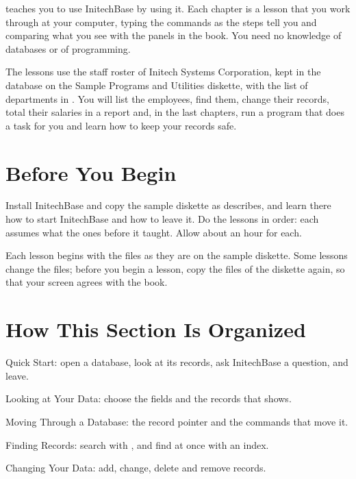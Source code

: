  teaches you to use InitechBase by using it.
Each chapter is a lesson that you work through at your computer, typing the
commands as the steps tell you and comparing what you see with the panels in
the book.  You need no knowledge of databases or of programming.

The lessons use the staff roster of Initech Systems Corporation, kept in the
database  on the Sample Programs and Utilities diskette, with
the list of departments in .  You will list the employees,
find them, change their records, total their salaries in a report and, in the
last chapters, run a program that does a task for you and learn how to
keep your records safe.

\section{Before You Begin}
Install InitechBase and copy the sample diskette as  describes, and learn there how to start InitechBase and how to leave
it.  Do the lessons in order: each assumes what the ones before it taught.
Allow about an hour for each.

Each lesson begins with the files as they are on the sample diskette.  Some
lessons change the files; before you begin a lesson, copy the files of the
diskette again, so that your screen agrees with the book.

\section{How This Section Is Organized}
Quick Start: open a database, look at its records, ask
InitechBase a question, and leave.

Looking at Your Data: choose the fields and the records
that  shows.

Moving Through a Database: the record pointer and the
commands that move it.

Finding Records: search with , and find at once
with an index.

Changing Your Data: add, change, delete and remove
records.


